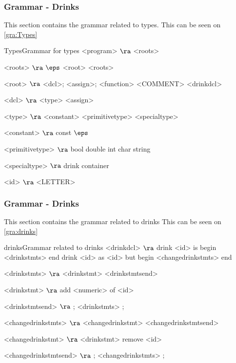 \subsubsection{Grammar - Drinks}
This section contains the grammar related to types. This can be seen on \ref{gra:Types}
\begin{grammatik}{Types}{Grammar for types}
<program> $\ra$ <roots>

<roots> $\ra$ $\eps$
\alt <root> <roots>

<root> $\ra$ <dcl>;
\alt <assign>;
\alt <function>
\alt <COMMENT>
\alt <drinkdcl>

<dcl> $\ra$ <type> <assign>

<type> $\ra$ <constant> <primitivetype>
\alt <specialtype>

<constant> $\ra$ const
\alt $\eps$

<primitivetype> $\ra$ bool
\alt double
\alt int
\alt char
\alt string

<specialtype> $\ra$ drink 
\alt container 

<id> $\ra$ <LETTER>
\end{grammatik}

\subsubsection{Grammar - Drinks}
This section contains the grammar related to drinks This can be seen on \ref{gra:drinks}
\begin{grammatik}{drinks}{Grammar related to drinks}
<drinkdcl> $\ra$ drink <id> is begin <drinkstmts> end
\alt drink <id> as <id> but begin <changedrinkstmts> end

<drinkstmts> $\ra$ <drinkstmt> <drinkstmtsend>

<drinkstmt> $\ra$ add <numeric> of <id>

<drinkstmtsend> $\ra$ ; <drinkstmts>
\alt ;

<changedrinkstmts> $\ra$ <changedrinkstmt> <changedrinkstmtsend>

<changedrinkstmt> $\ra$ <drinkstmt>
\alt remove <id>

<changedrinkstmtsend> $\ra$ ; <changedrinkstmts>
\alt ;
\end{grammatik}

